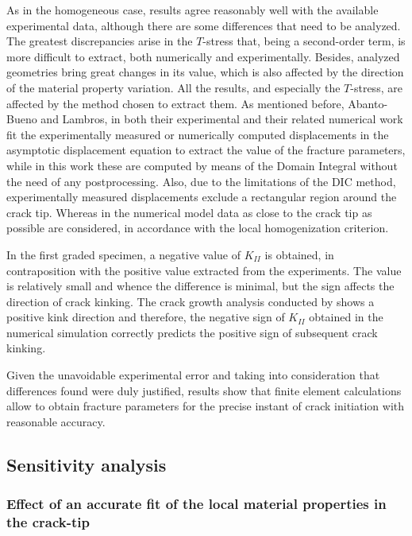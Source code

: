 As in the homogeneous case, results agree reasonably well with the available experimental data, although there are some differences that need to be analyzed. The greatest discrepancies arise in the $T$-stress that, being a second-order term, is more difficult to extract, both numerically and experimentally. Besides, analyzed geometries bring great changes in its value, which is also affected by the direction of the material property variation. All the results, and especially the $T$-stress, are affected by the method chosen to extract them. As mentioned before, Abanto-Bueno and Lambros, in both their experimental \citep{Abanto-Bueno2006} and their related numerical work \citep{Oral2008} fit the experimentally measured or numerically computed displacements in the asymptotic displacement equation to extract the value of the fracture parameters, while in this work these are computed by means of the Domain Integral without the need of any postprocessing. Also, due to the limitations of the DIC method, experimentally measured displacements exclude a rectangular region around the crack tip. Whereas in the numerical model data as close to the crack tip as possible are considered, in accordance with the local homogenization criterion.

In the first graded specimen, a negative value of $K_{II}$ is obtained, in contraposition with the positive value extracted from the experiments. The value is relatively small and whence the difference is minimal, but the sign affects the direction of crack kinking. The crack growth analysis conducted by \cite{Abanto-Bueno2006} shows a positive kink direction and therefore, the negative sign of $K_{II}$ obtained in the numerical simulation correctly predicts the positive sign of subsequent crack kinking.

Given the unavoidable experimental error and taking into consideration that differences found were duly justified, results show that finite element calculations allow to obtain fracture parameters for the precise instant of crack initiation with reasonable accuracy.

\subsection{Sensitivity analysis}

\subsubsection{Effect of an accurate fit of the local material properties in the crack-tip}

